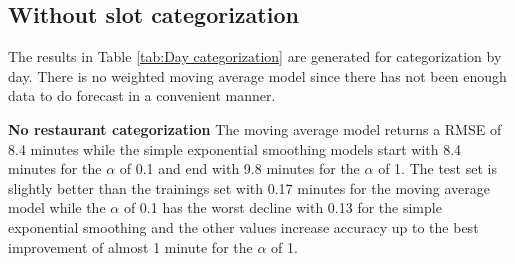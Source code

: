 \subsection{Without slot categorization}
The results in Table \ref{tab:Day categorization} are generated for categorization by day. There is no weighted moving average model since there has not been enough data to do forecast in a convenient manner.
\begin{table}[h]
\centering
\caption{Day categorization without slots}
\label{tab:Day categorization}
\end{table}
\newline\newline\textbf{No restaurant categorization}\newline
The moving average model returns a RMSE of 8.4 minutes while the simple exponential smoothing models start with 8.4 minutes for the $\alpha$ of 0.1 and end with 9.8 minutes for the $\alpha$ of 1. The test set is slightly better than the trainings set with 0.17 minutes for the moving average model while the $\alpha$ of 0.1 has the worst decline with 0.13 for the simple exponential smoothing and the other values increase accuracy up to the best improvement of almost 1 minute for the $\alpha$ of 1.\newline
